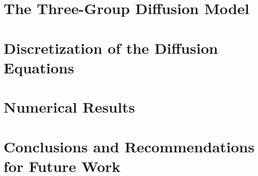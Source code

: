 \documentclass[12pt]{article}
\begin{document}
\section{The Three-Group Diffusion Model}

\section{Discretization of the Diffusion Equations}

\section{Numerical Results}

\section{Conclusions and Recommendations for Future Work}


\end{document}
